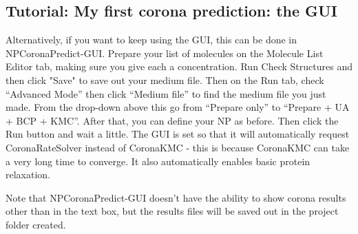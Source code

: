 \documentclass[10pt,a4paper,onecolumn]{report}
\begin{document}
\subsection{Tutorial: My first corona prediction: the GUI} \label{section:firstCoronaGUI}

Alternatively, if you want to keep using the GUI, this can be done in NPCoronaPredict-GUI. Prepare your list of molecules on the Molecule List Editor tab, making sure you give each a concentration. 
Run Check Structures and then click "Save" to save out your medium file.
 Then on the Run tab, check ``Advanced Mode'' then click ``Medium file'' to find the medium file you just made. 
From the drop-down above this go from ``Prepare only'' to ``Prepare + UA + BCP + KMC''. After that, you can define your NP as before. Then click the Run button and wait a little.
The GUI is set so that it will automatically request CoronaRateSolver instead of CoronaKMC - this is because CoronaKMC can take a very long time to converge. It also automatically enables basic protein relaxation.



Note that NPCoronaPredict-GUI doesn't have the ability to show corona results other than in the text box, but the results files will be saved out in the project folder created.
\end{document}
